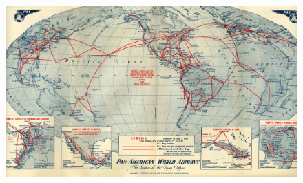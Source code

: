 \documentclass[aspectratio=169]{beamer}
\begin{document}
\begin{frame}
	
	\begin{figure}
		\centering
		\includegraphics[width=1\linewidth]{images/flight_path_panam_1948}
	\end{figure}
	
\end{frame}
\end{document}
